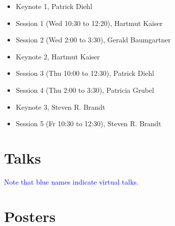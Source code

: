 \documentclass[12pt,letterpaper]{book}
\newenvironment{conf-abstract}[4][]{
 \needspace{10\baselineskip}
 \begin{center}
 { \renewcommand\textsuperscript[1]{}
 \phantomsection\addcontentsline{toc}{section}
 {\texorpdfstring{#2 (\emph{#3})}{#2 (#3)}}
 }
 {{\large\bfseries #2}\marginnote{#1}\par}
 \medskip
 {#3\par}
 \smallskip
 {\small #4\par}
 \end{center}
}{%
 \bigskip
 \hrule
 \bigskip
}
\newcommand{\indexauthors}[1]{%
 \forcsvlist{\index}{#1}
}
\begin{document}
\begin{itemize}
\item Keynote 1, Patrick Diehl
\item Session 1 (Wed 10:30 to 12:20), Hartmut Kaiser 
\item Session 2 (Wed 2:00 to 3:30), Gerald Baumgartner
\item Keynote 2, Hartmut Kaiser
\item Session 3 (Thu 10:00 to 12:30), Patrick Diehl
\item Session 4 (Thu 2:00 to 3:30), Patricia Grubel
\item Keynote 3, Steven R. Brandt
\item Session 5 (Fr 10:30 to 12:30), Steven R. Brandt 
\end{itemize}

\chapter{Talks}
\textcolor{blue}{Note that blue names indicate virtual talks.}

{
\begin{conf-abstract}[\datum\\\tiny\time]
{\title}
{\first~ \last}
{\affiliation}
\indexauthors{\last~\first}

\newpage
\end{conf-abstract}
}

\chapter{Posters}

{
\def\x{\last}
\def\y{\substring{\x}{1}{1}\par}
\begin{conf-abstract}[\datum\\\time]
{\title}
{\first~\last}
{\affiliation}
\indexauthors{\last~\first}
\begin{center}

\end{center}
\end{conf-abstract}
}


%
\end{document}
